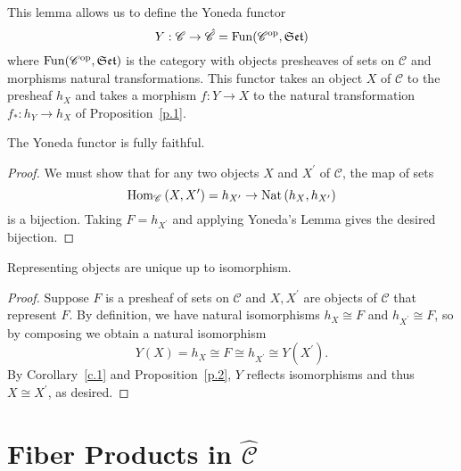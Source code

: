 \documentclass[dissertation.tex]{subfiles}
\begin{document}
This lemma allows us to define the Yoneda functor
$$Y : \mathscr{C} \rightarrow \hat{\mathscr{C}} = \operatorname{Fun}(\mathscr{C}^\text{op}, \mathfrak{Set})$$
where $\operatorname{Fun}(\mathscr{C}^\text{op}, \mathfrak{Set})$ is the category with objects presheaves of sets on $\mathscr{C}$ and morphisms natural transformations.
This functor takes an object $X$ of $\mathscr{C}$ to the presheaf $h_X$ and takes a morphism $f : Y \rightarrow X$ to the natural transformation $f_* : h_Y \rightarrow h_X$ of Proposition~\ref{p.1}.

\begin{cor}\label{c.1}
  The Yoneda functor is fully faithful.

  \begin{proof}
    We must show that for any two objects $X$ and $X^\prime$ of $\mathscr{C}$, the map of sets
    $$\operatorname{Hom}_{\mathscr{C}}\left(X,X^\prime\right) = h_{X^\prime} \rightarrow \operatorname{Nat}\left(h_X,h_{X^\prime}\right)$$
    is a bijection.
    Taking $F = h_{X^\prime}$ and applying Yoneda's Lemma gives the desired bijection.
  \end{proof}
\end{cor}

\begin{cor}
  Representing objects are unique up to isomorphism.

  \begin{proof}
    Suppose $F$ is a presheaf of sets on $\mathscr{C}$ and $X, X^\prime$ are objects of $\mathscr{C}$ that represent $F$.
    By definition, we have natural isomorphisms $h_X \cong F$ and $h_{X^\prime} \cong F$, so by composing we obtain a natural isomorphism
    $$Y(X) = h_X \cong F \cong h_{X^\prime} \cong Y(X^\prime).$$
    By Corollary~\ref{c.1} and Proposition~\ref{p.2}, $Y$ reflects isomorphisms and thus $X \cong X^\prime$, as desired.
  \end{proof}
\end{cor}

\section{Fiber Products in $\hat{\mathscr{C}}$}
\end{document}
